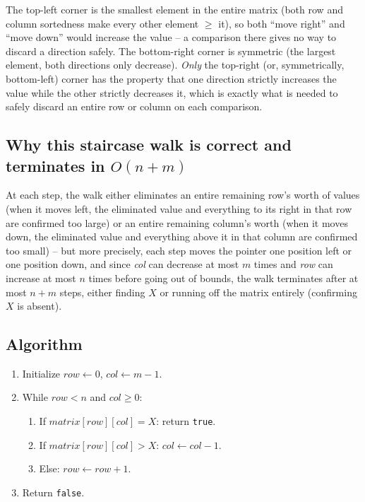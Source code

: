 \begin{ideabox}
The top-left corner is the smallest element in the entire matrix (both
row and column sortedness make every other element $\ge$ it), so both
``move right'' and ``move down'' would increase the value -- a comparison
there gives no way to discard a direction safely. The bottom-right corner
is symmetric (the largest element, both directions only decrease).
\emph{Only} the top-right (or, symmetrically, bottom-left) corner has the
property that one direction strictly increases the value while the other
strictly decreases it, which is exactly what is needed to safely discard
an entire row or column on each comparison.
\end{ideabox}

\subsection*{Why this staircase walk is correct and terminates in $O(n+m)$}

At each step, the walk either eliminates an entire remaining row's worth
of values (when it moves left, the eliminated value and everything to its
right in that row are confirmed too large) or an entire remaining column's
worth (when it moves down, the eliminated value and everything above it in
that column are confirmed too small) -- but more precisely, each step
moves the pointer one position left or one position down, and since
\textit{col} can decrease at most $m$ times and \textit{row} can increase
at most $n$ times before going out of bounds, the walk terminates after at
most $n+m$ steps, either finding $X$ or running off the matrix entirely
(confirming $X$ is absent).

\subsection*{Algorithm}

\begin{enumerate}
  \item Initialize $\textit{row} \gets 0$, $\textit{col} \gets m-1$.
  \item While $\textit{row} < n$ and $\textit{col} \ge 0$:
  \begin{enumerate}
    \item If $\textit{matrix}[\textit{row}][\textit{col}] = X$: return
          \texttt{true}.
    \item If $\textit{matrix}[\textit{row}][\textit{col}] > X$:
          $\textit{col} \gets \textit{col}-1$.
    \item Else: $\textit{row} \gets \textit{row}+1$.
  \end{enumerate}
  \item Return \texttt{false}.
\end{enumerate}

